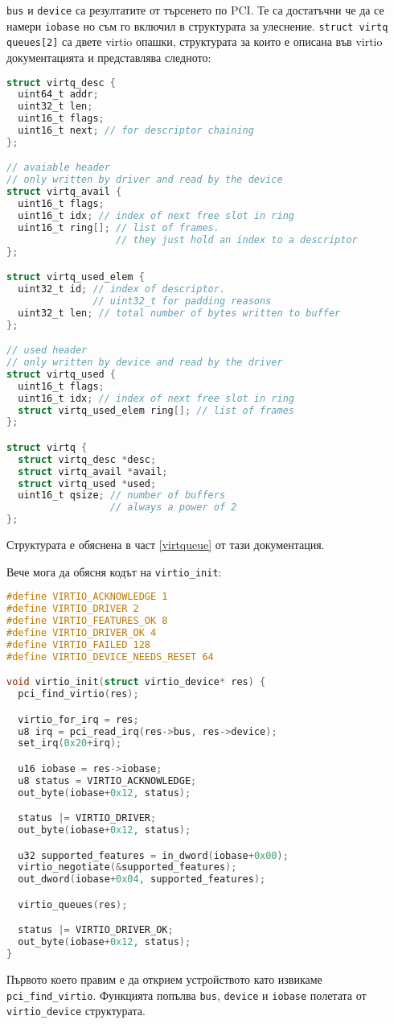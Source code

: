 {\tt bus} и {\tt device} са резултатите от търсенето по PCI. Те са достатъчни че да се намери {\tt iobase} но съм го включил в структурата за улеснение. {\tt struct virtq queues[2]} са двете virtio опашки, структурата за които е описана във virtio документацията\parencite{virtiodocs} и представлява следното:
\begin{lstlisting}[language=C]
struct virtq_desc {
  uint64_t addr;
  uint32_t len;
  uint16_t flags;
  uint16_t next; // for descriptor chaining
};

// avaiable header
// only written by driver and read by the device
struct virtq_avail {
  uint16_t flags;
  uint16_t idx; // index of next free slot in ring
  uint16_t ring[]; // list of frames.
                   // they just hold an index to a descriptor
};

struct virtq_used_elem {
  uint32_t id; // index of descriptor.
               // uint32_t for padding reasons
  uint32_t len; // total number of bytes written to buffer
};

// used header
// only written by device and read by the driver
struct virtq_used {
  uint16_t flags;
  uint16_t idx; // index of next free slot in ring
  struct virtq_used_elem ring[]; // list of frames
};

struct virtq {
  struct virtq_desc *desc;
  struct virtq_avail *avail;
  struct virtq_used *used;
  uint16_t qsize; // number of buffers
                  // always a power of 2
};
\end{lstlisting}
Структурата е обяснена в част \ref{virtqueue} от тази документация.

Вече мога да обясня кодът на {\tt virtio\_init}:
\begin{lstlisting}[language=C]
#define VIRTIO_ACKNOWLEDGE 1
#define VIRTIO_DRIVER 2
#define VIRTIO_FEATURES_OK 8
#define VIRTIO_DRIVER_OK 4
#define VIRTIO_FAILED 128
#define VIRTIO_DEVICE_NEEDS_RESET 64

void virtio_init(struct virtio_device* res) {
  pci_find_virtio(res);

  virtio_for_irq = res;
  u8 irq = pci_read_irq(res->bus, res->device);
  set_irq(0x20+irq);

  u16 iobase = res->iobase;
  u8 status = VIRTIO_ACKNOWLEDGE;
  out_byte(iobase+0x12, status);

  status |= VIRTIO_DRIVER;
  out_byte(iobase+0x12, status);

  u32 supported_features = in_dword(iobase+0x00);
  virtio_negotiate(&supported_features);
  out_dword(iobase+0x04, supported_features);

  virtio_queues(res);

  status |= VIRTIO_DRIVER_OK;
  out_byte(iobase+0x12, status);
}
\end{lstlisting}
Първото което правим е да открием устройството като извикаме {\tt pci\_find\_virtio}. Функцията попълва {\tt bus}, {\tt device} и {\tt iobase} полетата от {\tt virtio\_device} структурата.

